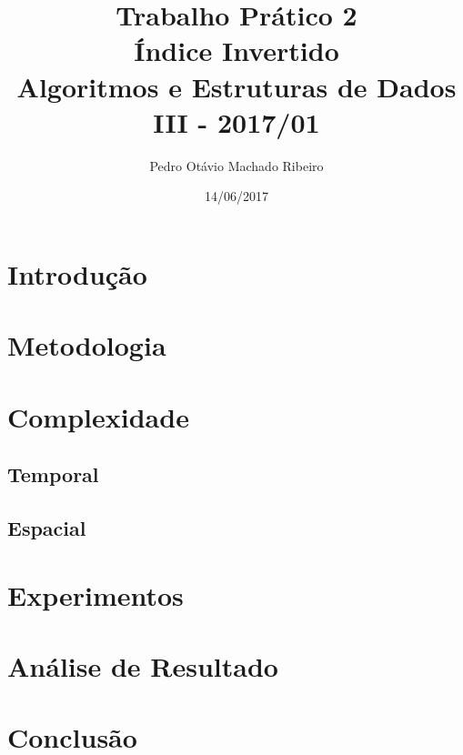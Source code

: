 \documentclass[
	12pt,
	a4paper,
	onepage,
	brazil
]{article}
\author{Pedro Otávio Machado Ribeiro}
\title{Trabalho Prático 2\\Índice Invertido\\Algoritmos e Estruturas de Dados III - 2017/01}
\date{14/06/2017}
\begin{document}
	\maketitle
	
	\section{Introdução}
	
	\section{Metodologia}
	
	\section{Complexidade}
	
	\subsection{Temporal}

	\subsection{Espacial}
	
	\section{Experimentos}
	
	\section{Análise de Resultado}
	
	\section{Conclusão}
	
	\nocite{*}
	
	\printbibliography[title=Referências]
\end{document}
